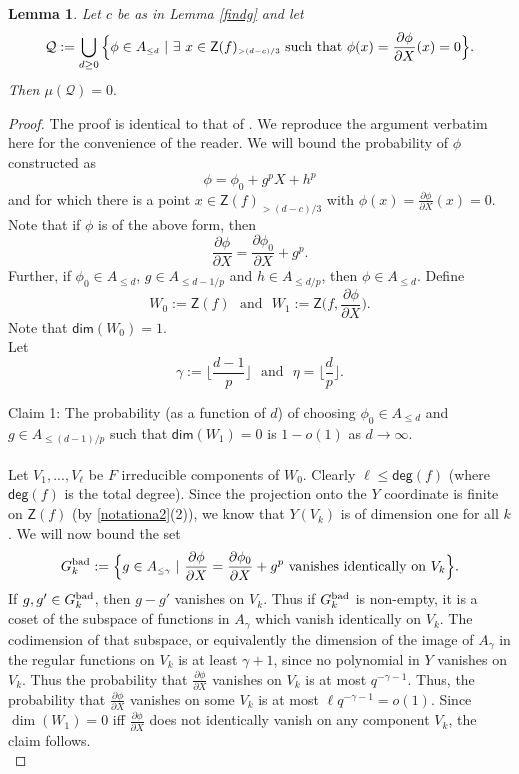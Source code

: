 \documentclass[10pt]{amsart}
\theoremstyle{plain}
\newtheorem{lemma}[thm]{Lemma}
\theoremstyle{definition}
\newcommand{\rdown}[1]{\lfloor{#1}\rfloor}
\newcommand{\del}{\partial}
\newcommand{\sQ}{{\mathcal Q}}
\let\syn\mathsf
\newcommand{\scr}{\scriptscriptstyle}
\newcommand{\dg}{\syn{deg}}
\begin{document}
\begin{lemma} \label{findh} Let $c$ be as in Lemma \ref{findg} and let $$\sQ:=\bigcup_{d\geq 0} \Big\{\phi\in A_{\scr \leq d} \ |\ \exists\  x\in \syn{Z}(f)_{\scr >  (d-c)/{3}} \ {\rm  such \ that } \ \phi(x)= \frac{\del \phi}{\del X}(x)= 0\Big\}.$$ Then ${\mu}(\sQ)=0.$
\end{lemma}
\begin{proof} The proof is identical to that of \cite[2.6]{poonen}. We reproduce the argument verbatim here for the convenience of the reader. We will bound the probability of  $\phi$ constructed as 
 $$\phi=\phi_0+g^p X+h^p$$ and for which there is a point $x\in \syn{Z}(f)_{\scr >  (d-c)/{3}}$ with $\phi(x)= \frac{\del \phi}{\del X}(x)= 0$.  Note that if $\phi$ is of the above form, then $$ \frac{\partial \phi}{\partial X}=\frac{\partial \phi_0}{\partial X}+g^p.$$ Further, if 
$\phi_0\in A_{\scr \leq d}$, $g \in A_{\scr \leq d-1/p}$ 
 and $h\in A_{\scr \leq d/p}$, then $\phi\in A_{\scr \leq d}$.
  Define $$W_0:=\syn{Z}(f) \ \ \ \text{and} \ \ \ W_1:=\syn{Z}\Big(f,\frac{\del \phi}{\del X}\Big).$$ 
Note that $\syn{dim}(W_0)=1$.   \\
Let  $$ \gamma:= \rdown{\frac{d-1}{p}} \ \ \ \text{and} \ \ \ \eta= \rdown{\frac{d}{p}}.$$

\noindent Claim 1:  The probability (as a function of $d$) of choosing $\phi_0 \in A_{\scr \leq d}$ and $g\in A_{\scr \leq (d-1)/p}$   such that $\syn{dim}(W_1)=0$ is $1-o(1)$ as $d\to \infty$.\\ \\
 Let $V_1,...,V_{\ell}$ be $F$ irreducible components of $W_0$. Clearly $\ell\leq \dg(f)$ (where $\dg(f)$ is the total degree). Since the projection onto the $Y$ coordinate is finite on $\syn{Z}(f)$ (by \eqref{notationa2}(2)), we know that $Y(V_k)$ is of dimension one for all $k$. 
We will now bound the set 
$$ G_k^{\rm bad} := \Big\{ g \in A_{\scr \leq \gamma} \ | \ \frac{\partial \phi}{\partial X}= \frac{\partial \phi_0}{\partial X}+g^p \ \text{vanishes identically on}\  V_k \Big\}.$$
If $g,g'\in G_k^{\rm bad}$, then $g-g'$ vanishes on $V_k$. Thus if $G_k^{\rm bad}$ is non-empty, it is a coset of the subspace of functions in $A_{\scr \gamma}$ which vanish identically on $V_k$. The codimension of that subspace, or equivalently the dimension of the image of $A_{\scr \gamma}$ in the regular functions on $V_k$ is at least $\gamma+1$, since no polynomial in $Y$ vanishes on $V_k$. Thus the probability that $\frac{\partial \phi}{\partial X}$ vanishes on $V_k$ is at most $q^{-\gamma-1}$. Thus, the probability that $\frac{\partial \phi}{\partial X}$ vanishes on some $V_k$ is at most $\ell q^{-\gamma-1}=o(1)$.  Since $\dim(W_1)=0$ iff $\frac{\partial \phi}{\partial X}$ does not identically vanish on any component $V_k$, the claim follows. \\



\end{proof}
\end{document}

